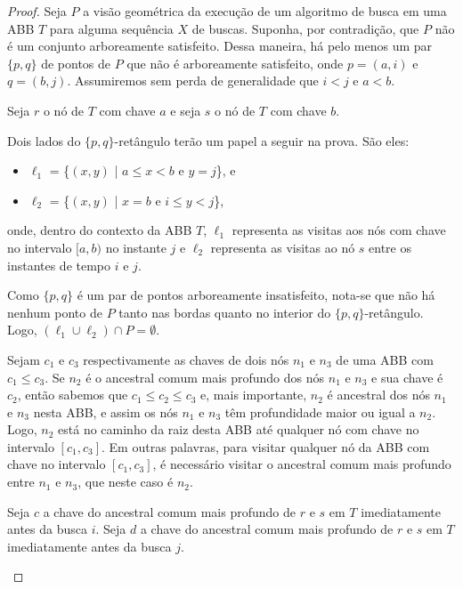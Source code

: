 \begin{proof}
Seja $P$ a visão geométrica da execução de um algoritmo de busca em uma ABB $T$ para alguma sequência $X$ de buscas.
Suponha, por contradição, que $P$ não é um conjunto arboreamente satisfeito. Dessa maneira, há pelo menos um par $\{p,q\}$ de pontos de $P$ que não é arboreamente satisfeito, onde $p = (a,i)$ e $q = (b,j)$. Assumiremos sem perda de generalidade que $i < j$ e $a < b$.

Seja $r$ o nó de $T$ com chave $a$ e seja $s$ o nó de $T$ com chave $b$.

Dois lados do $\{p,q\}$-retângulo terão um papel a seguir na prova. São eles:
\begin{itemize}
    \item $\ell_1$ = \{$(x,y)$ | $a \leq x < b$ e $y = j$\}, e
    \item $\ell_2$ = \{$(x,y)$ | $x = b$ e $i \leq y < j$\},
\end{itemize}
onde, dentro do contexto da ABB $T$, $\ell_1$ representa as visitas aos nós com chave no intervalo $[a,b)$ no instante $j$ e $\ell_2$ representa as visitas ao nó $s$ entre os instantes de tempo $i$ e $j$.

Como $\{p,q\}$ é um par de pontos arboreamente insatisfeito, nota-se que não há nenhum ponto de $P$ tanto nas bordas quanto no interior do $\{p,q\}$-retângulo. Logo, $(\ell_1 \cup \ell_2) \cap P = \emptyset$.

Sejam $c_1$ e $c_3$ respectivamente as chaves de dois nós $n_1$ e $n_3$ de uma ABB com $c_1 \leq c_3$. Se $n_2$ é o ancestral comum mais profundo dos nós $n_1$ e $n_3$ e sua chave é $c_2$, então sabemos que $c_1 \leq c_2 \leq c_3$ e, mais importante, $n_2$ é ancestral dos nós $n_1$ e $n_3$ nesta ABB, e assim os nós $n_1$ e $n_3$ têm profundidade maior ou igual a $n_2$. Logo, $n_2$ está no caminho da raiz desta ABB até qualquer nó com chave no intervalo $[c_1,c_3]$. Em outras palavras, para visitar qualquer nó da ABB com chave no intervalo $[c_1,c_3]$, é necessário visitar o ancestral comum mais profundo entre $n_1$ e $n_3$, que neste caso é $n_2$.

\begin{center}
\begin{minipage}[t]{0.6\textwidth}
    Seja $c$ a chave do ancestral comum mais profundo de $r$ e $s$ em $T$ imediatamente antes da busca $i$. Seja $d$ a chave do ancestral comum mais profundo de $r$ e $s$ em $T$ imediatamente antes da busca $j$.
    

\end{minipage}
\end{center}
\end{proof}
